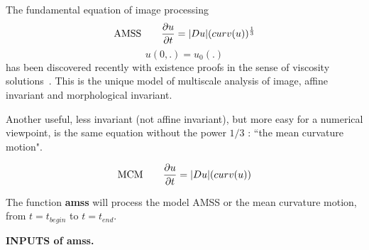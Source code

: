\def\vfp{\vspace{5mm}}
\def\la{_\lambda }
\def\med{\hbox{med}}
\def\real{I\!\!R}
\def\entier{I\!\!N}
\def\MONO {{\tt [Order Preserving] }}
\def\Morp {{\tt [Morphology] }}
\def\MORP {{\tt [Pure Morphology] }}
\def\CONS {{\tt [Consistency] }}
\def\CONV {{\tt [Convergence] }}
\def\ECHE {{\tt [Scale invariance] }}
\def\ROTA {{\tt [Isom. invariance] }}
\def\AFFI {{\tt [Affine invariance] }}
\def\skipaline {\vspace{4 mm}}

{}

The fundamental equation of image processing
\begin{equation}
\hbox{AMSS} \qquad \frac{\partial u}{\partial t} = \vert Du \vert (curv(u))^{\frac{1}{3}} 
\end{equation}
$$ u(0,.) = u_0(.)$$
has been discovered recently with existence proofs in the sense of viscosity
solutions~\cite{alvarez.guichard.ea:axioms}. 
This is the unique model of multiscale analysis of image, affine invariant and morphological
invariant.

Another useful, less invariant (not affine invariant), but more easy for a numerical viewpoint,
is the same equation without the power $1/3$ : ``the mean curvature motion".

\begin{equation}
\hbox{MCM} \qquad
\frac{\partial u}{\partial t} = \vert Du \vert (curv(u)) 
\end{equation}


The function {\bf amss} will process the model AMSS or the mean curvature motion, from $t = t_{begin}$ to $t = t_{end}$.


\skipaline
{\bf INPUTS of amss.}


